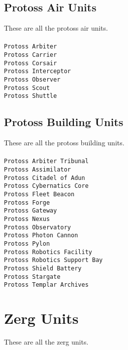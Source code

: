 \subsection{Protoss Air Units}
These are all the protoss air units.
\\\\
\verb|Protoss Arbiter| \\
\verb|Protoss Carrier| \\
\verb|Protoss Corsair| \\
\verb|Protoss Interceptor| \\
\verb|Protoss Observer| \\
\verb|Protoss Scout| \\
\verb|Protoss Shuttle| \\

\subsection{Protoss Building Units}
These are all the protoss building units.
\\\\
\verb|Protoss Arbiter Tribunal| \\
\verb|Protoss Assimilator| \\
\verb|Protoss Citadel of Adun| \\
\verb|Protoss Cybernatics Core| \\
\verb|Protoss Fleet Beacon| \\
\verb|Protoss Forge| \\
\verb|Protoss Gateway| \\
\verb|Protoss Nexus| \\
\verb|Protoss Observatory| \\
\verb|Protoss Photon Cannon| \\
\verb|Protoss Pylon| \\
\verb|Protoss Robotics Facility| \\
\verb|Protoss Robotics Support Bay| \\
\verb|Protoss Shield Battery| \\
\verb|Protoss Stargate| \\
\verb|Protoss Templar Archives| \\

\section{Zerg Units}
These are all the zerg units.

